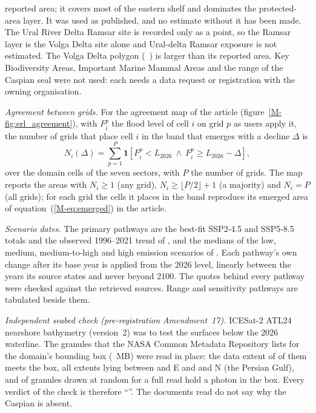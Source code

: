 reported area; it covers most of the eastern shelf and dominates the protected-area layer. It was used as published, and no estimate without it has been made. The Ural River Delta Ramsar site is recorded only as a point, so the Ramsar layer is the Volga Delta site alone and Ural-delta Ramsar exposure is not estimated. The Volga Delta polygon (~\kmsq{}) is larger than its reported area. Key Biodiversity Areas, Important Marine Mammal Areas and the range of the Caspian seal were not used: each needs a data request or registration with the owning organisation.

\emph{Agreement between grids.} For the agreement map of the article (figure~\ref{M-fig:erl_agreement}), with $F^{p}_i$ the flood level of cell $i$ on grid $p$ as users apply it, the number of grids that place cell $i$ in the band that emerges with a decline $\Delta$ is
\begin{equation}
  N_i(\Delta) = \sum_{p=1}^{P} \mathbf{1}\!\left[ F^{p}_i < L_{2026} \ \wedge\ F^{p}_i \ge L_{2026} - \Delta \right] ,
  \label{eq:si_agreement}
\end{equation}
over the domain cells of the seven sectors, with $P$ the number of grids. The map reports the areas with $N_i \ge 1$ (any grid), $N_i \ge \lfloor P/2 \rfloor + 1$ (a majority) and $N_i = P$ (all grids); for each grid the cells it places in the band reproduce its emerged area of equation~(\ref{M-eq:emerged}) in the article.

\emph{Scenario dates.} The primary pathways are the best-fit SSP2-4.5 and SSP5-8.5 totals and the observed 1996--2021 trend of \citet{samant2023}, and the medians of the low, medium, medium-to-high and high emission scenarios of \citet{hoseini2025}. Each pathway's own change after its base year is applied from the 2026 level, linearly between the years its source states and never beyond 2100. The quotes behind every pathway were checked against the retrieved sources. Range and sensitivity pathways are tabulated beside them.

\emph{Independent seabed check (pre-registration Amendment~17).} ICESat-2 ATL24 nearshore bathymetry (version~2)\citep{atl24_v2,is2_atl24_atbd_v2} was to test the surfaces below the 2026 waterline. The  granules that the NASA Common Metadata Repository lists for the domain's bounding box (~MB) were read in place: the data extent of  of them meets the box, all extents lying between \textdegree{} and \textdegree{}E and \textdegree{} and \textdegree{}N (the Persian Gulf), and  of  granules drawn at random for a full read hold a photon in the box. Every verdict of the check is therefore ``''. The documents read do not say why the Caspian is absent.
